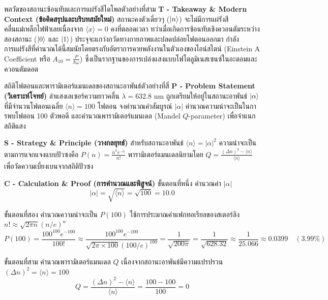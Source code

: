 \begin{psctbox}{พลวัตของสถานะซ้อนทับและการแผ่รังสีไดโพล}{ตัวอย่างที่สาม}
\vspace{6pt}
\noindent\textbf{T - Takeaway \& Modern Context (ข้อคิดสรุปและบริบทสมัยใหม่)} สถานะคงตัวเดี่ยวๆ ($\ket{n}$) จะไม่มีการแผ่รังสีคลื่นแม่เหล็กไฟฟ้าเลยเนื่องจาก $\langle x \rangle = 0$ คงที่ตลอดเวลา ทว่าเมื่อเกิดการซ้อนทับเชิงควอนตัมระหว่างสองสถานะ ($\ket{0}$ และ $\ket{1}$) ประจุจะแกว่งกวัดทางกายภาพและปลดปล่อยโฟตอนออกมา กำลังการแผ่รังสีที่คำนวณได้นี้สมนัยโดยตรงกับอัตราการคายพลังงานในตัวเองของไอน์สไตน์ (Einstein A Coefficient หรือ $A_{10} = \frac{P}{\hbar\omega}$) ซึ่งเป็นรากฐานของการเปล่งแสงแบบโฟโตลูมิเนสเซนซ์ในอะตอมและควอนตัมดอต
\end{psctbox}

\begin{psctbox}{สถิติโฟตอนและพารามิเตอร์แมนเดลของสถานะอาพันธ์}{ตัวอย่างที่สี่}
\noindent\textbf{P - Problem Statement (วิเคราะห์โจทย์)} ลำแสงเลเซอร์ความยาวคลื่น $\lambda = 632.8\text{ nm}$ ถูกเตรียมให้อยู่ในสถานะอาพันธ์ $\ket{\alpha}$ ที่มีจำนวนโฟตอนเฉลี่ย $\langle n \rangle = 100$ โฟตอน จงคำนวณค่าสัมบูรณ์ $|\alpha|$ คำนวณความน่าจะเป็นในการพบโฟตอน 100 ตัวพอดี และคำนวณพารามิเตอร์แมนเดล (Mandel $Q$-parameter) เพื่อจำแนกสถิติแสง

\vspace{6pt}
\noindent\textbf{S - Strategy \& Principle (วางกลยุทธ์)} สำหรับสถานะอาพันธ์ $\langle n \rangle = |\alpha|^2$ ความน่าจะเป็นตามการแจกแจงแบบปัวซงคือ $P(n) = \frac{\bar{n}^n e^{-\bar{n}}}{n!}$ พารามิเตอร์แมนเดลนิยามโดย $Q = \frac{(\Delta n)^2 - \langle n \rangle}{\langle n \rangle}$ เพื่อวัดความเบี่ยงเบนจากสถิติปัวซง

\vspace{6pt}
\noindent\textbf{C - Calculation \& Proof (การคำนวณและพิสูจน์)}
ขั้นตอนที่หนึ่ง คำนวณค่า $|\alpha|$
\begin{equation}
|\alpha| = \sqrt{\langle n \rangle} = \sqrt{100} = 10.0
\end{equation}

ขั้นตอนที่สอง คำนวณความน่าจะเป็น $P(100)$
ใช้การประมาณค่าแฟกทอเรียลของสเตอร์ลิง $n! \approx \sqrt{2\pi n}(n/e)^n$
\begin{equation}
P(100) = \frac{100^{100} e^{-100}}{100!} \approx \frac{100^{100} e^{-100}}{\sqrt{2\pi \times 100}(100/e)^{100}} = \frac{1}{\sqrt{200\pi}} = \frac{1}{\sqrt{628.32}} \approx \frac{1}{25.066} \approx 0.0399 \quad (3.99\%)
\end{equation}

ขั้นตอนที่สาม คำนวณพารามิเตอร์แมนเดล $Q$
เนื่องจากสถานะอาพันธ์มีความแปรปรวน $(\Delta n)^2 = \langle n \rangle = 100$
\begin{equation}
Q = \frac{(\Delta n)^2 - \langle n \rangle}{\langle n \rangle} = \frac{100 - 100}{100} = 0
\end{equation}


\end{psctbox}
